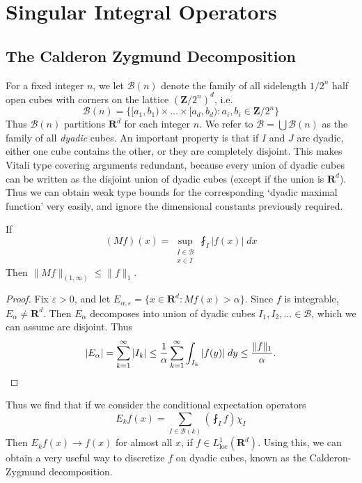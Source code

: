 \chapter{Singular Integral Operators}



\section{The Calderon Zygmund Decomposition}

For a fixed integer $n$, we let $\mathcal{B}(n)$ denote the family of all sidelength $1/2^n$ half open cubes with corners on the lattice $(\mathbf{Z}/2^n)^d$, i.e.
%
\[ \mathcal{B}(n) = \{ [a_1,b_1) \times \dots \times [a_d,b_d) : a_i, b_i \in \mathbf{Z}/2^n \} \]
%
Thus $\mathcal{B}(n)$ partitions $\mathbf{R}^d$ for each integer $n$. We refer to $\mathcal{B} = \bigcup \mathcal{B}(n)$ as the family of all \emph{dyadic} cubes. An important property is that if $I$ and $J$ are dyadic, either one cube contains the other, or they are completely disjoint. This makes Vitali type covering arguments redundant, because every union of dyadic cubes can be written as the disjoint union of dyadic cubes (except if the union is $\mathbf{R}^d$). Thus we can obtain weak type bounds for the corresponding `dyadic maximal function' very easily, and ignore the dimensional constants previously required.

\begin{theorem}
  If
  \[ (Mf)(x) = \sup_{\substack{I \in \mathcal{B}\\x \in I}} \fint_I |f(x)|\; dx \]
  Then $\| Mf \|_{(1,\infty)} \leq \| f \|_1$.
\end{theorem}
\begin{proof}
  Fix $\varepsilon > 0$, and let $E_{\alpha,\varepsilon} = \{ x \in \mathbf{R}^d: Mf(x) > \alpha \}$. Since $f$ is integrable, $E_\alpha \neq \mathbf{R}^d$. Then $E_\alpha$ decomposes into union of dyadic cubes $I_1, I_2, \dots \in \mathcal{B}$, which we can assume are disjoint. Thus
  \[ |E_\alpha| = \sum_{k = 1}^\infty |I_k| \leq \frac{1}{\alpha} \sum_{k = 1}^\infty \int_{I_k} |f(y)|\; dy \leq \frac{\| f \|_1}{\alpha}. \qedhere \]
\end{proof}

Thus we find that if we consider the conditional expectation operators
%
\[ E_k f(x) = \sum_{I \in \mathcal{B}(k)} \left( \fint_I f \right) \chi_I \]
%
Then $E_k f(x) \to f(x)$ for almost all $x$, if $f \in L^1_{\text{loc}}(\mathbf{R}^d)$. Using this, we can obtain a very useful way to discretize $f$ on dyadic cubes, known as the Calderon-Zygmund decomposition.

